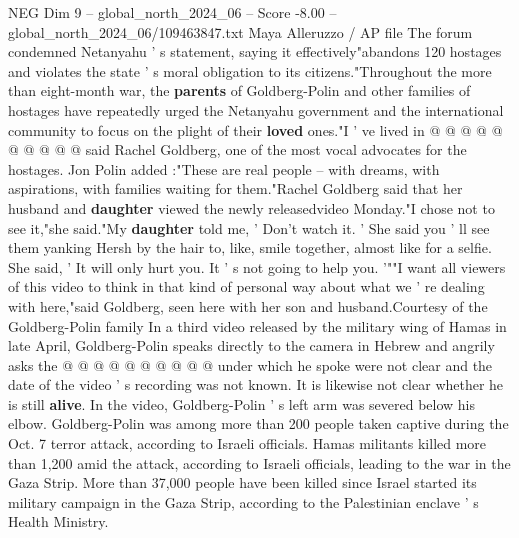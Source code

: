 \begin{textsample}{NEG Dim 9 – global\_north\_2024\_06 – Score -8.00 – global\_north\_2024\_06/109463847.txt}
Maya Alleruzzo / AP file The forum condemned Netanyahu ' s statement, saying it effectively"abandons 120 hostages and violates the state ' s moral obligation to its citizens."Throughout the more than eight-month war, the \textbf{parents} of Goldberg-Polin and other families of hostages have repeatedly urged the Netanyahu government and the international community to focus on the plight of their \textbf{loved} ones."I ' ve lived in @ @ @ @ @ @ @ @ @ @ said Rachel Goldberg, one of the most vocal advocates for the hostages.
Jon Polin added :"These are real people -- with dreams, with aspirations, with families waiting for them."Rachel Goldberg said that her husband and \textbf{daughter} viewed the newly releasedvideo Monday."I chose not to see it,"she said."My \textbf{daughter} told me, ' Don't watch it. ' She said you ' ll see them yanking Hersh by the hair to, like, smile together, almost like for a selfie.
She said, ' It will only hurt you.
It ' s not going to help you. '""I want all viewers of this video to think in that kind of personal way about what we ' re dealing with here,"said Goldberg, seen here with her son and husband.Courtesy of the Goldberg-Polin family In a third video released by the military wing of Hamas in late April, Goldberg-Polin speaks directly to the camera in Hebrew and angrily asks the @ @ @ @ @ @ @ @ @ @ under which he spoke were not clear and the date of the video ' s recording was not known.
It is likewise not clear whether he is still \textbf{alive}.
In the video, Goldberg-Polin ' s left arm was severed below his elbow.
Goldberg-Polin was among more than 200 people taken captive during the Oct. 7 terror attack, according to Israeli officials.
Hamas militants killed more than 1,200 amid the attack, according to Israeli officials, leading to the war in the Gaza Strip.
More than 37,000 people have been killed since Israel started its military campaign in the Gaza Strip, according to the Palestinian enclave ' s Health Ministry.

\end{textsample}
